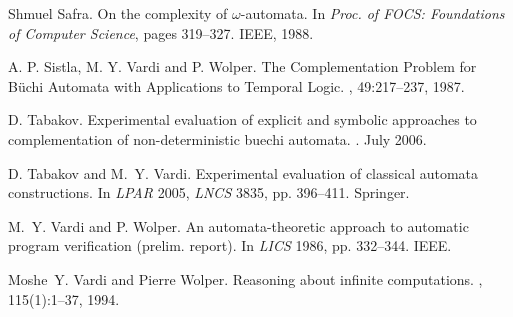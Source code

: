 \documentclass{LMCS}
\begin{document}
\begin{thebibliography}{DDHR06]}
Shmuel Safra.
\newblock On the complexity of $\omega$-automata.
\newblock In {\em Proc. of FOCS: Foundations of Computer Science}, pages
  319--327. IEEE, 1988.

A. P. Sistla, M. Y. Vardi and P. Wolper.
\newblock The Complementation Problem for B{\"u}chi Automata with Applications to Temporal Logic.
, 49:217--237, 1987.


D. Tabakov.
\newblock Experimental evaluation of explicit and symbolic approaches to
  complementation of non-deterministic buechi automata.
. July 2006.

D. Tabakov and M.~Y. Vardi.
\newblock Experimental evaluation of classical automata constructions.
\newblock In {\em LPAR} 2005, {\em LNCS} 3835, pp. 396--411. Springer.

M.~Y. Vardi and P. Wolper.
\newblock An automata-theoretic approach to automatic program verification
  (prelim. report).
\newblock In {\em LICS} 1986, pp. 332--344. IEEE.

Moshe~Y. Vardi and Pierre Wolper.
\newblock Reasoning about infinite computations.
, 115(1):1--37, 1994.

\end{thebibliography}
\fi
\end{document}
